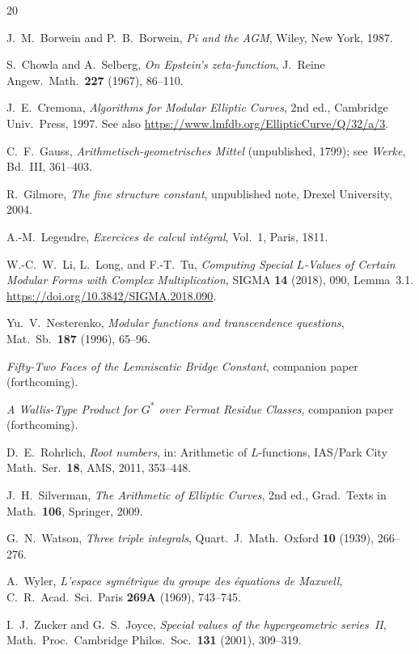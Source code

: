 \documentclass[12pt,reqno]{amsart}
\theoremstyle{definition}
\theoremstyle{remark}
\begin{document}
\begin{thebibliography}{20}

J.~M.~Borwein and P.~B.~Borwein,
\emph{Pi and the AGM},
Wiley, New York, 1987.

S.~Chowla and A.~Selberg,
\emph{On Epstein's zeta-function},
J.~Reine Angew.\ Math.\ \textbf{227} (1967), 86--110.

J.~E.~Cremona,
\emph{Algorithms for Modular Elliptic Curves}, 2nd ed.,
Cambridge Univ.\ Press, 1997.
See also \url{https://www.lmfdb.org/EllipticCurve/Q/32/a/3}.

C.~F.~Gauss,
\emph{Arithmetisch-geometrisches Mittel} (unpublished, 1799); see
\emph{Werke}, Bd.~III, 361--403.

R.~Gilmore,
\emph{The fine structure constant},
unpublished note, Drexel University, 2004.

A.-M.~Legendre,
\emph{Exercices de calcul int\'{e}gral}, Vol.~1, Paris, 1811.

W.-C.~W.~Li, L.~Long, and F.-T.~Tu,
\emph{Computing Special $L$-Values of Certain Modular Forms with Complex
Multiplication}, SIGMA \textbf{14} (2018), 090, Lemma~3.1.
\url{https://doi.org/10.3842/SIGMA.2018.090}.

Yu.~V.~Nesterenko,
\emph{Modular functions and transcendence questions},
Mat.\ Sb.\ \textbf{187} (1996), 65--96.

\emph{Fifty-Two Faces of the Lemniscatic Bridge Constant},
companion paper (forthcoming).

\emph{A Wallis-Type Product for $G^{\!*}$ over Fermat Residue Classes},
companion paper (forthcoming).

D.~E.~Rohrlich,
\emph{Root numbers}, in: Arithmetic of $L$-functions, IAS/Park City Math.\
Ser.\ \textbf{18}, AMS, 2011, 353--448.

J.~H.~Silverman,
\emph{The Arithmetic of Elliptic Curves}, 2nd ed., Grad.\ Texts in Math.\
\textbf{106}, Springer, 2009.

G.~N.~Watson,
\emph{Three triple integrals},
Quart.\ J.\ Math.\ Oxford \textbf{10} (1939), 266--276.

A.~Wyler,
\emph{L'espace sym\'etrique du groupe des \'equations de Maxwell},
C.~R.\ Acad.\ Sci.\ Paris \textbf{269A} (1969), 743--745.

I.~J.~Zucker and G.~S.~Joyce,
\emph{Special values of the hypergeometric series~II},
Math.\ Proc.\ Cambridge Philos.\ Soc.\ \textbf{131} (2001), 309--319.

\end{thebibliography}
\end{document}
